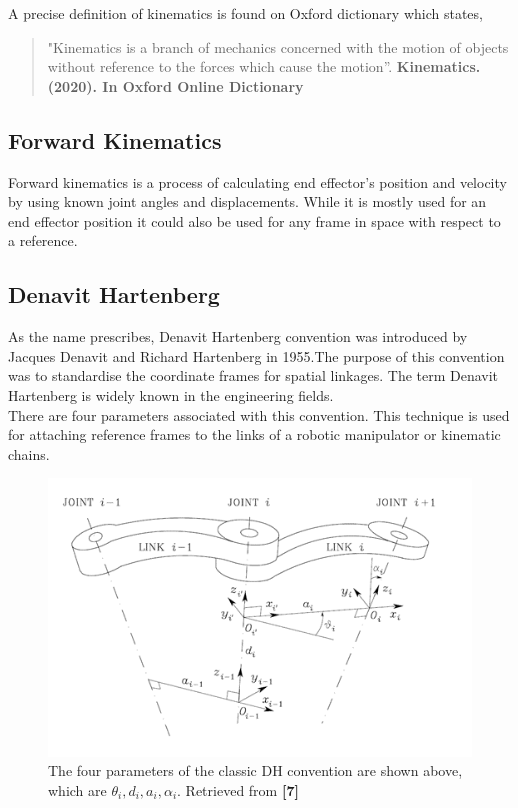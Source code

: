 \documentclass{UoNMCHA}
\numberwithin{equation}{section}
\begin{document}
	A precise definition of kinematics is found on Oxford dictionary which states, \begin{quote}
		"Kinematics is a branch of mechanics concerned with the motion of objects without reference to the forces which cause the motion”.\textbf{ Kinematics. (2020). In Oxford Online Dictionary }
	\end{quote} 
	
	\subsection{Forward Kinematics}
	
	Forward kinematics is a process of calculating end effector’s position and velocity by using known joint angles and displacements. While it is mostly used for an end effector position it could also be used for any frame in space with respect to a reference.
	
	\subsection*{Denavit Hartenberg}
	As the name prescribes, Denavit Hartenberg convention was introduced by Jacques Denavit and Richard Hartenberg in 1955.The purpose of this convention was to standardise the coordinate frames for spatial linkages. The term Denavit Hartenberg is widely known in the engineering fields. \\
	
	\newpage
	There are four parameters associated with this convention. This technique is used for attaching reference frames to the links of a robotic manipulator or kinematic chains.
	
	\begin{figure}[H]
		\begin{center}
			\includegraphics[width=.8\linewidth]{figs/Picture2}
			\caption{The four parameters of the classic $\mathrm{DH}$ convention are shown above, which are $\theta_{i}, d_{i}, a_{i}, \alpha_{i}$. Retrieved from \textbf{[7]}}
			\label{figs/Picture2}
		\end{center}
	\end{figure}
	
\end{document}
